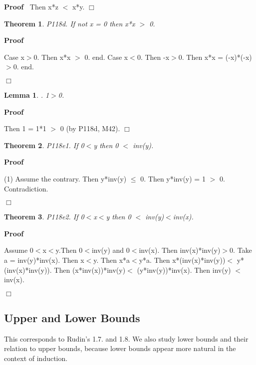 \documentclass{article}
\newenvironment{forthel}{\begin{leftbar}}{\end{leftbar}}
\newenvironment{proof}{\noindent\textbf{Proof\ }}{\hspace*{\fill}$\Box$\medskip}
\newtheorem{lemma}{Lemma}
\newtheorem{theorem}{Theorem}
\begin{document}
\begin{forthel}
\begin{proof}
	Then x*z $<$ x*y.
	\end{proof}

	
	\begin{theorem}
 P118d. If not x = 0 then x*x $>$ 0.
\end{theorem}	\begin{proof}

	Case x$>$0. Then x*x $>$ 0.
	end.
	Case x$<$0. Then -x$>$0. Then x*x = (-x)*(-x)$>$0.
	end.
	
	\end{proof}

	\begin{lemma}. 1$>$0. 

\end{lemma}
	\begin{proof}

	Then 1 = 1*1 $>$ 0 (by P118d, M42).
	\end{proof}

	
	\begin{theorem}
 P118e1. If 0$<$y then 0 $<$ inv(y).
\end{theorem}	\begin{proof}

	(1) Assume the contrary.
	Then y*inv(y) $\leq$ 0.
	Then y*inv(y) = 1 $>$ 0.
	Contradiction.
	
	\end{proof}

	\begin{theorem}
 P118e2. If 0$<$x$<$y then 0 $<$ inv(y)$<$inv(x).
\end{theorem}	\begin{proof}
 
	Assume 0$<$x$<$y.Then 0$<$inv(y) and 0$<$inv(x).
	Then inv(x)*inv(y)$>$0.
	Take a = inv(y)*inv(x).	
	Then x$<$y. Then x*a$<$y*a.
	Then x*(inv(x)*inv(y))$<$ y*(inv(x)*inv(y)).
	Then (x*inv(x))*inv(y)$<$ (y*inv(y))*inv(x).
	Then inv(y) $<$ inv(x).
	
	\end{proof}

	

\end{forthel}

\subsection{Upper and Lower Bounds}
This corresponds to Rudin's 1.7. and 1.8. We also study lower bounds and their relation to upper bounds, because lower bounds appear more natural in the context of induction.
\end{document}
